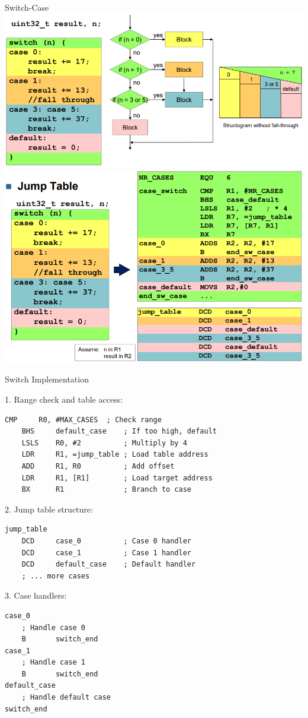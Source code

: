 \columnbreak

\begin{definition}{Switch-Case}\\
\includegraphics[width=\linewidth]{images/switchcases.png}\\
\includegraphics[width=0.9\linewidth]{images/switchcases2.png}
\end{definition}

\begin{KR}{Switch Implementation}

1. Range check and table access:
\begin{lstlisting}[language=armasm, style=basesmol]
    CMP     R0, #MAX_CASES  ; Check range
    BHS     default_case    ; If too high, default
    LSLS    R0, #2          ; Multiply by 4
    LDR     R1, =jump_table ; Load table address
    ADD     R1, R0          ; Add offset
    LDR     R1, [R1]        ; Load target address
    BX      R1              ; Branch to case
\end{lstlisting}

2. Jump table structure:
\begin{lstlisting}[language=armasm, style=basesmol]
jump_table
    DCD     case_0          ; Case 0 handler
    DCD     case_1          ; Case 1 handler
    DCD     default_case    ; Default handler
    ; ... more cases
\end{lstlisting}

3. Case handlers:
\begin{lstlisting}[language=armasm, style=basesmol]
case_0
    ; Handle case 0
    B       switch_end
case_1
    ; Handle case 1
    B       switch_end
default_case
    ; Handle default case
switch_end
\end{lstlisting}
\end{KR}



